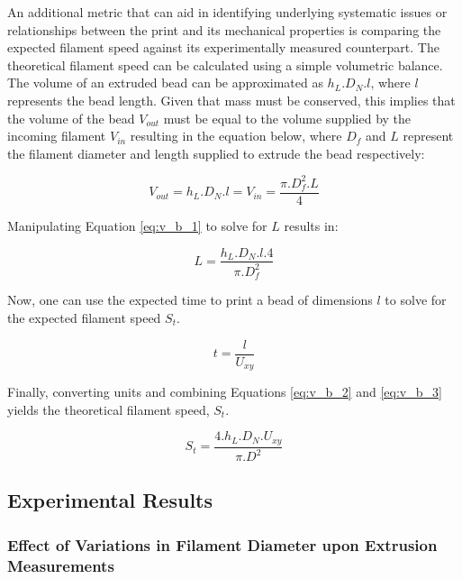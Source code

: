 \documentclass[main.tex]{subfiles}
\begin{document}
An additional metric that can aid in identifying underlying systematic issues or relationships between the print and its mechanical properties is comparing the expected filament speed against its experimentally measured counterpart. The theoretical filament speed can be calculated using a simple volumetric balance. The volume of an extruded bead can be approximated as $h_{L}. D_{N}. l$, where $l$ represents the bead length. Given that mass must be conserved, this implies that the volume of the bead $V_{out}$ must be equal to the volume supplied by the incoming filament $V_{in}$ resulting in the equation below, where $D_{f}$ and $L$ represent the filament diameter and length supplied to extrude the bead respectively:

\begin{equation} \label{eq:v_b_1}
	V_{out}= h_{L} . D_{N} . l = V_{in} = \frac{\pi . D_{f}^2 . L}{4}
\end{equation}

Manipulating Equation \ref{eq:v_b_1} to solve for $L$ results in:

\begin{equation} \label{eq:v_b_2}
	L = \frac{h_{L}. D_{N}. l. 4}{\pi . D_{f}^2}
\end{equation}

Now, one can use the expected time to print a bead of dimensions $l$ to solve for the expected filament speed $S_{t}$.

\begin{equation} \label{eq:v_b_3}
	t = \frac{l}{U_{xy}}
\end{equation}

Finally, converting units and combining Equations \ref{eq:v_b_2} and \ref{eq:v_b_3} yields the theoretical filament speed, $S_{t}$. 

\begin{equation} \label{eq:v_b_4}
	S_{t}=\frac{4. h_{L}. D_{N}. U_{xy}}{\pi . D^2}
\end{equation}

\subsection{Experimental Results}\label{ssec:ml_exp_r}

\subsubsection{Effect of Variations in Filament Diameter upon Extrusion Measurements}
\end{document}
